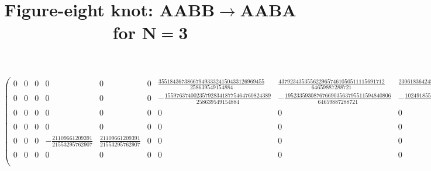 \documentclass[12pt]{scrartcl}
\begin{document}
\title{Figure-eight knot: $\boldsymbol{AABB \longrightarrow AABA}$ for $\boldsymbol{N=3}$}
\author{}
\date{}
\maketitle


{\tiny 
$$\left(
\begin{array}{*{36}{c}}
0 & 0 & 0 & 0 & 0 & 0 & \frac{3551843673866794933324150433126969455}{258639549154884} & \frac{4379234353556229657461050511115691712}{64659887288721} & \frac{2306183642487761919199837574670030697}{129319774577442} & 0 & -\frac{56326398297052193145829274934095126}{64659887288721} & 0 & 0 & 0 & 0 & 0 & 0 & 0 & 0 & 0 & 0 & 0 & 0 & 0 & 0 & 0 & 0 & 0 & 0 & 0 & 0 & 0 & 0 & 0 & 0 & 0 \\
0 & 0 & 0 & 0 & 0 & 0 & -\frac{1559763740023579283418775464760824389}{258639549154884} & -\frac{1952335930876766903563795511594840806}{64659887288721} & -\frac{1024918558877467084553091531200468747}{129319774577442} & 0 & \frac{24894519567631254303989064433828858}{64659887288721} & 0 & 0 & 0 & 0 & 0 & 0 & 0 & 0 & 0 & 0 & 0 & 0 & 0 & 0 & 0 & 0 & 0 & 0 & 0 & 0 & 0 & 0 & 0 & 0 & 0 \\
0 & 0 & 0 & 0 & 0 & 0 & 0 & 0 & 0 & \frac{186371354459617532598424295627035663129810}{193979661866163} & 0 & 0 & 0 & -\frac{102804370915389713571448479064136071935500}{193979661866163} & 0 & -\frac{20265702132233823534699274353835885771699}{193979661866163} & 0 & 0 & 0 & -\frac{65273087389875625692532218075026080639333}{387959323732326} & 0 & 0 & 0 & 0 & 0 & 0 & 0 & 0 & 0 & 0 & 0 & 0 & 0 & 0 & 0 & 0 \\
0 & 0 & 0 & 0 & 0 & 0 & 0 & 0 & 0 & 0 & 0 & -\frac{21109661209391}{21553295762907} & \frac{21109661209391}{21553295762907} & 0 & 0 & 0 & 0 & 0 & 0 & 0 & 0 & 0 & 0 & 0 & 0 & 0 & 0 & 0 & 0 & 0 & 0 & 0 & 0 & 0 & 0 & 0 \\
0 & 0 & 0 & -\frac{21109661209391}{21553295762907} & \frac{21109661209391}{21553295762907} & 0 & 0 & 0 & 0 & 0 & 0 & 0 & 0 & 0 & 0 & 0 & 0 & 0 & 0 & 0 & 0 & 0 & 0 & 0 & 0 & 0 & 0 & 0 & 0 & 0 & 0 & 0 & 0 & 0 & 0 & 0 \\
0 & 0 & 0 & 0 & 0 & 0 & 0 & 0 & 0 & 0 & 0 & 0 & 0 & 0 & 0 & 0 & 0 & \frac{1516734722331634614613032142375570901177542839613731947474322469675422931805368130781245419785660571}{3871145639585467987280741259731094773935793427007779220487391135042584939418384991321411797563173870848} & -\frac{3060732866345586649700949394338810807789553798622923285177485935355469125439246717807248798432090821689}{1290381879861822662426913753243698257978597809002593073495797045014194979806128330440470599187724623616} & 0 & 0 & \frac{6368725089349789245186573195831192820176697209208412432074318148361563336007039415172056389445196762357}{3871145639585467987280741259731094773935793427007779220487391135042584939418384991321411797563173870848} & 0 & 0 & 0 & 0 & 0 & 0 & 0 & 0 & 0 & 0 & 0 & 0 & 0 & 0 \\

\end{array}$$}
\end{document}

